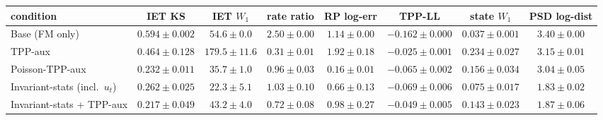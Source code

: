 \begin{tabular}{lccccccc}
\toprule
condition & IET KS & IET $W_1$ & rate ratio & RP log-err & TPP-LL & state $W_1$ & PSD log-dist \\
\midrule
Base (FM only) & $0.594 \pm 0.002$ & $54.6 \pm 0.0$ & $2.50 \pm 0.00$ & $1.14 \pm 0.00$ & $-0.162 \pm 0.000$ & $0.037 \pm 0.001$ & $3.40 \pm 0.00$ \\
TPP-aux & $0.464 \pm 0.128$ & $179.5 \pm 11.6$ & $0.31 \pm 0.01$ & $1.92 \pm 0.18$ & $-0.025 \pm 0.001$ & $0.234 \pm 0.027$ & $3.15 \pm 0.01$ \\
Poisson-TPP-aux & $0.232 \pm 0.011$ & $35.7 \pm 1.0$ & $0.96 \pm 0.03$ & $0.16 \pm 0.01$ & $-0.065 \pm 0.002$ & $0.156 \pm 0.034$ & $3.04 \pm 0.05$ \\
Invariant-stats (incl.\ $u_t$) & $0.262 \pm 0.025$ & $22.3 \pm 5.1$ & $1.03 \pm 0.10$ & $0.66 \pm 0.13$ & $-0.069 \pm 0.006$ & $0.075 \pm 0.017$ & $1.83 \pm 0.02$ \\
Invariant-stats + TPP-aux & $0.217 \pm 0.049$ & $43.2 \pm 4.0$ & $0.72 \pm 0.08$ & $0.98 \pm 0.27$ & $-0.049 \pm 0.005$ & $0.143 \pm 0.023$ & $1.87 \pm 0.06$ \\
\bottomrule
\end{tabular}